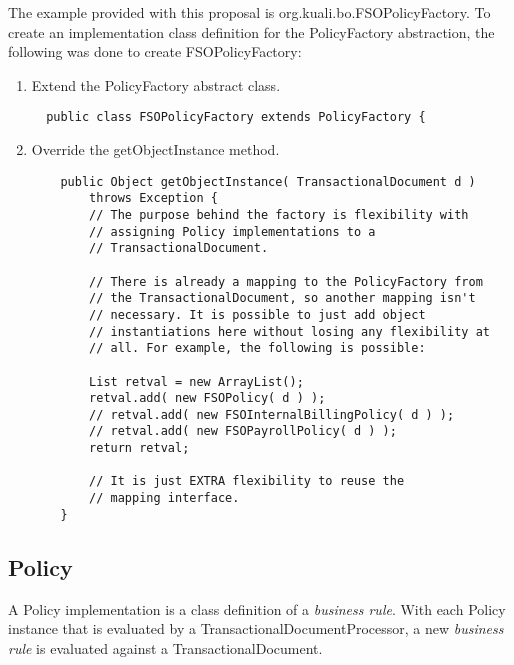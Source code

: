 \documentclass[12pt]{article}
\begin{document}
   The example provided with this proposal is
 \sf org.kuali.bo.FSOPolicyFactory\rm. 
To create an implementation class definition for the \sf PolicyFactory \rm 
abstraction,
the following was done to create \sf FSOPolicyFactory\rm:
\begin{enumerate}
  \item Extend the \sf PolicyFactory \rm abstract class.
  \sf \begin{verbatim}
  public class FSOPolicyFactory extends PolicyFactory {
  \end{verbatim} \rm
  \item Override the \sf getObjectInstance \rm method.
  \sf \begin{verbatim}
    public Object getObjectInstance( TransactionalDocument d )
        throws Exception {
        // The purpose behind the factory is flexibility with
        // assigning Policy implementations to a
        // TransactionalDocument.

        // There is already a mapping to the PolicyFactory from 
        // the TransactionalDocument, so another mapping isn't
        // necessary. It is possible to just add object 
        // instantiations here without losing any flexibility at 
        // all. For example, the following is possible:

        List retval = new ArrayList();
        retval.add( new FSOPolicy( d ) );
        // retval.add( new FSOInternalBillingPolicy( d ) );
        // retval.add( new FSOPayrollPolicy( d ) );
        return retval;

        // It is just EXTRA flexibility to reuse the 
        // mapping interface.
    }
  \end{verbatim} \rm
\end{enumerate}


  \subsection{Policy}
A \sf Policy \rm implementation is a class definition of a \emph{business rule}.
 With each \sf Policy \rm instance that is evaluated by a 
\sf TransactionalDocumentProcessor\rm, a new \emph{business rule} is 
evaluated against a \sf TransactionalDocument\rm. 
\end{document}
